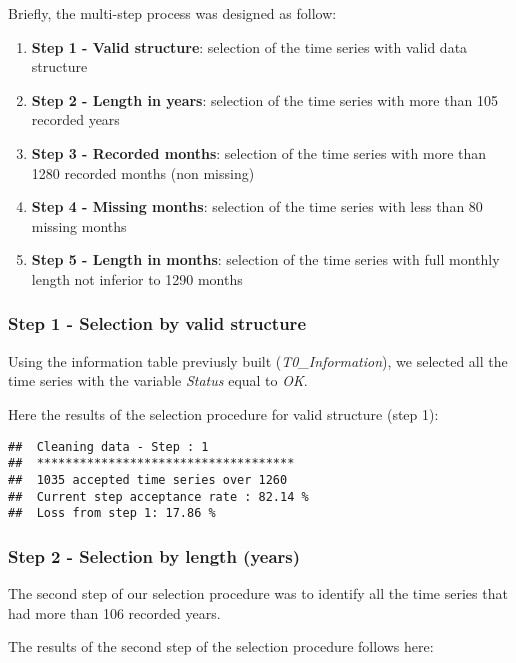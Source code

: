 \documentclass[]{article}
\begin{document}
Briefly, the multi-step process was designed as follow:

\begin{enumerate}
\def\labelenumi{\arabic{enumi}.}
\item
  \textbf{Step 1 - Valid structure}: selection of the time series with
  valid data structure
\item
  \textbf{Step 2 - Length in years}: selection of the time series with
  more than 105 recorded years
\item
  \textbf{Step 3 - Recorded months}: selection of the time series with
  more than 1280 recorded months (non missing)
\item
  \textbf{Step 4 - Missing months}: selection of the time series with
  less than 80 missing months
\item
  \textbf{Step 5 - Length in months}: selection of the time series with
  full monthly length not inferior to 1290 months
\end{enumerate}

\hypertarget{step-1---selection-by-valid-structure}{%
\subsubsection{Step 1 - Selection by valid
structure}\label{step-1---selection-by-valid-structure}}

Using the information table previusly built (\emph{T0\_Information}), we
selected all the time series with the variable \emph{Status} equal to
\emph{OK}.

Here the results of the selection procedure for valid structure (step
1):

\begin{verbatim}
##  Cleaning data - Step : 1 
##  ************************************ 
##  1035 accepted time series over 1260 
##  Current step acceptance rate : 82.14 % 
##  Loss from step 1: 17.86 %
\end{verbatim}

\hypertarget{step-2---selection-by-length-years}{%
\subsubsection{Step 2 - Selection by length
(years)}\label{step-2---selection-by-length-years}}

The second step of our selection procedure was to identify all the time
series that had more than 106 recorded years.

The results of the second step of the selection procedure follows here:
\end{document}
